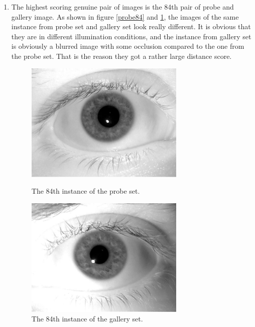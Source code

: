 \documentclass[a4paper]{article}
\begin{document}
\begin{spacing}{2.0}
\begin{enumerate}
	\item The highest scoring genuine pair of images is the 84th pair of probe and gallery image. As shown in figure \ref{probe84} and \ref{gallery84}, the images of the same instance from probe set and gallery set look really different. It is obvious that they are in different illumination conditions, and the instance from gallery set is obviously a blurred image with some occlusion compared to the one from the probe set. That is the reason they got a rather large distance score.
	\begin{figure}[H]
	\begin{minipage}[t]{0.5\linewidth}
	\centering
	\includegraphics[width = 3in]{probe84.jpg}
	\caption{The 84th instance of the probe set.}
	\label{probe84}
	\end{minipage}
	\begin{minipage}[t]{0.5\linewidth}
	\centering
	\includegraphics[width = 3in]{gallery84.jpg}
	\caption{The 84th instance of the gallery set.}
	\label{gallery84}
	\end{minipage}
	\end{figure}
	

\end{enumerate}
\end{spacing}
\end{document}
